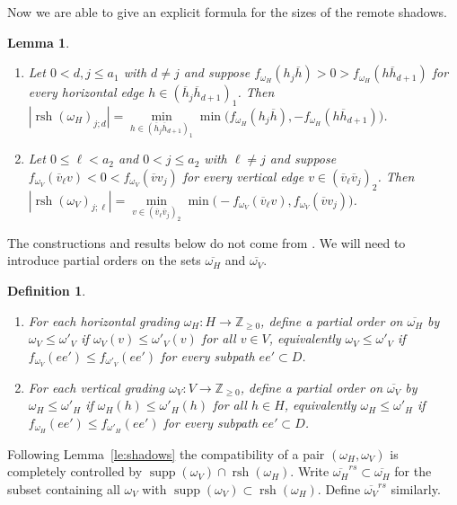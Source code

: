 \documentclass{amsart}
\newtheorem{definition}[theorem]{Definition}
\newtheorem{lemma}[theorem]{Lemma}
\newcommand{\ZZ}{\mathbb{Z}}
\newcommand{\supp}{\operatorname{supp}}
\newcommand{\rsh}{\operatorname{rsh}}
\newenvironment{enumeratea}{\begin{enumerate}[\upshape (a)]}
                           {\end{enumerate}}
\begin{document}
 Now we are able to give an explicit formula for the sizes of the remote shadows.
 \begin{lemma}\label{le:remote_shadow_sizes}\mbox{}
  \begin{enumeratea}
   \item Let $0<d,j\le a_1$ with $d\ne j$ and suppose $f_{\omega_H}(h_j\overline{h})>0>f_{\omega_H}(h\overline{h}_{d+1})$ for every horizontal edge $h\in (\overline{h}_j\overline{h}_{d+1})_1$.  Then $|\rsh(\omega_H)_{j;d}|=\min\limits_{h\in (\overline{h}_j\overline{h}_{d+1})_1}\min\big(f_{\omega_H}(h_j\overline{h}),-f_{\omega_H}(h\overline{h}_{d+1})\big)$.
   \item Let $0\le\ell< a_2$ and $0<j\le a_2$ with $\ell\ne j$ and suppose $f_{\omega_V}(\overline{v}_\ell v)<0<f_{\omega_V}(\overline{v}v_j)$ for every vertical edge $v\in (\overline{v}_\ell\overline{v}_j)_2$.  Then $|\rsh(\omega_V)_{j;\ell}|=\min\limits_{v\in (\overline{v}_\ell\overline{v}_j)_2}\min\big(-f_{\omega_V}(\overline{v}_\ell v),f_{\omega_V}(\overline{v}v_j)\big)$.
  \end{enumeratea}
 \end{lemma}

 The constructions and results below do not come from \cite{llz}.  We will need to introduce partial orders on the sets $\overline{\omega_H}$ and $\overline{\omega_V}$.
 \begin{definition}\label{def:partial_order}\mbox{}
  \begin{enumeratea}
   \item For each horizontal grading $\omega_H:H\to\ZZ_{\ge0}$, define a partial order on $\overline{\omega_H}$ by $\omega_V\le \omega'_V$ if $\omega_V(v)\le\omega'_V(v)$ for all $v\in V$, equivalently $\omega_V\le\omega'_V$ if $f_{\omega_V}(ee')\le f_{\omega'_V}(ee')$ for every subpath $ee'\subset D$.
   \item For each vertical grading $\omega_V:V\to\ZZ_{\ge0}$, define a partial order on $\overline{\omega_V}$ by $\omega_H\le \omega'_H$ if $\omega_H(h)\le\omega'_H(h)$ for all $h\in H$, equivalently $\omega_H\le\omega'_H$ if $f_{\omega_H}(ee')\le f_{\omega'_H}(ee')$ for every subpath $ee'\subset D$.
  \end{enumeratea}
 \end{definition}

 Following Lemma~\ref{le:shadows} the compatibility of a pair $(\omega_H,\omega_V)$ is completely controlled by $\supp(\omega_V)\cap\rsh(\omega_H)$.  Write $\overline{\omega_H}^{rs}\subset\overline{\omega_H}$ for the subset containing all $\omega_V$ with $\supp(\omega_V)\subset\rsh(\omega_H)$.  Define $\overline{\omega_V}^{rs}$ similarly.
\end{document}
